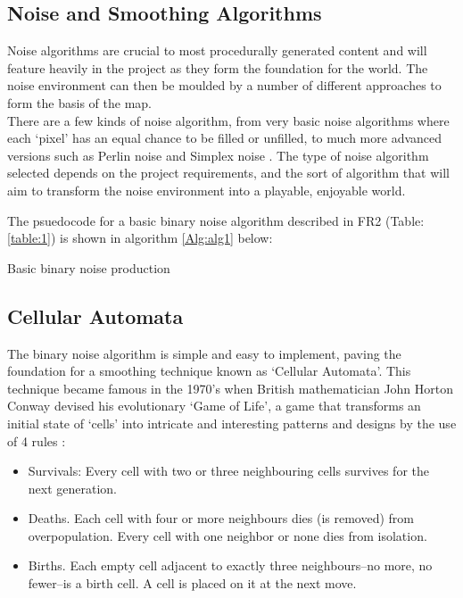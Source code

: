 \documentclass[12pt,a4paper]{article}
\begin{document}
\subsection{Noise and Smoothing Algorithms}
\label{subsec:noise}

Noise algorithms are crucial to most procedurally generated content and will feature heavily in the project as they form the foundation for the world. The noise environment can then be moulded by a number of different approaches to form the basis of the map. \\

There are a few kinds of noise algorithm, from very basic noise algorithms where each `pixel' has an equal chance to be filled or unfilled, to much more advanced versions such as Perlin noise and Simplex noise \cite{textmodel}\cite{improvepnoise}. The type of noise algorithm selected depends on the project requirements, and the sort of algorithm that will aim to transform the noise environment into a playable, enjoyable world. 

The psuedocode for a basic binary noise algorithm described in FR2 (Table:\ref{table:1}) is shown in algorithm \ref{Alg:alg1} below:

\begin{algorithm}
	\caption{Basic binary noise production}
	\label{Alg:alg1}
\end{algorithm}


\subsection{Cellular Automata}

The binary noise algorithm is simple and easy to implement, paving the foundation for a smoothing technique known as `Cellular Automata'. This technique became famous in the 1970's when British mathematician John Horton Conway devised his evolutionary `Game of Life', a game that transforms an initial state of `cells' into intricate and interesting patterns and designs by the use of 4 rules \cite{cellauto}: 

\begin{itemize}
	\item Survivals: Every cell with two or three neighbouring cells survives for the next generation.
	\item Deaths. Each cell with four or more neighbours dies (is removed) from overpopulation. Every cell with one neighbor or none dies from isolation.
	\item Births. Each empty cell adjacent to exactly three neighbours--no more, no fewer--is a birth cell. A cell is placed on it at the next move.
\end{itemize}
\end{document}
